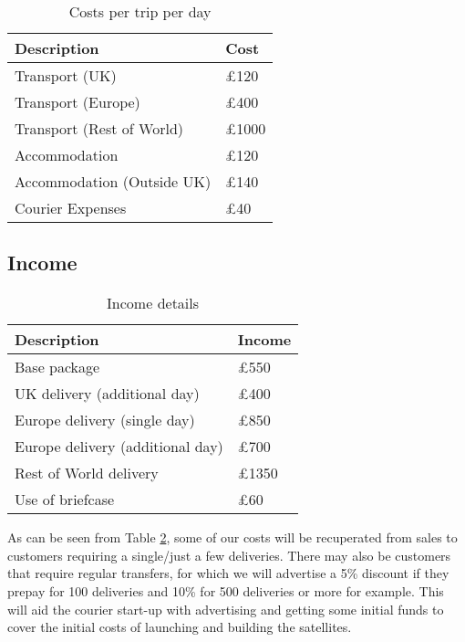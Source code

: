 \begin{table}[H]
    \centering
    \begin{tabular}{|p{}|p{}|}
        \hline
        \textbf{Description} & \textbf{Cost} \\
        \hline
        Transport (UK) & £120\\
        \hline
        Transport (Europe) & £400\\
        \hline
        Transport (Rest of World) & £1000 \\
        \hline
        Accommodation & £120\\
        \hline
        Accommodation (Outside UK) & £140\\
        \hline
        Courier Expenses & £40\\
        \hline
    \end{tabular}
    \caption{Costs per trip per day}
    \label{tab:tripCosts}
\end{table}

\subsection{Income}

\begin{table}[H]
    \centering
    \begin{tabular}{|p{}|p{}|}
        \hline
        \textbf{Description} & \textbf{Income} \\
        \hline
        Base package & £550 \\
         \hline
        UK delivery (additional day) & £400 \\
        \hline
        Europe delivery (single day) & £850 \\
        \hline
        Europe delivery (additional day) & £700\\
        \hline
        Rest of World delivery & £1350\\
        \hline
        Use of briefcase & £60\\
        \hline
    \end{tabular}
    \caption{Income details}
    \label{tab:customerPricing}
\end{table}

As can be seen from Table \ref{tab:customerPricing}, some of our costs will be recuperated from sales to customers requiring a single/just a few deliveries. There may also be customers that require regular transfers, for which we will advertise a 5\% discount if they prepay for 100 deliveries and 10\% for 500 deliveries or more for example. This will aid the courier start-up with advertising and getting some initial funds to cover the initial costs of launching and building the satellites.

